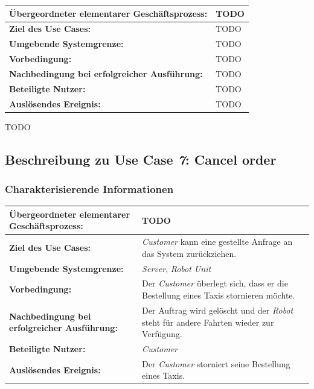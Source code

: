 			\begin{table}[H]
				\centering
				\begin{tabularx}{\textwidth}{|p{5cm}|X|}
					\hline
					\textbf{Übergeordneter elementarer Geschäftsprozess:} & TODO  \\ \hline
					\textbf{Ziel des Use Cases:} & TODO \\ \hline
					\textbf{Umgebende Systemgrenze:} & TODO \\ \hline
					\textbf{Vorbedingung:} & TODO \\ \hline
					\textbf{Nachbedingung bei erfolgreicher Ausführung:} & TODO \\ \hline
					\textbf{Beteiligte Nutzer:} & TODO \\ \hline
					\textbf{Auslösendes Ereignis:} & TODO \\
					\hline
				\end{tabularx}
			\end{table}
			
			TODO
			
			
			\pagebreak
	
		\subsection{Beschreibung zu Use Case \emph{7}: Cancel order}
			\subsubsection*{Charakterisierende Informationen}
			
			\begin{table}[H]
				\centering
				\begin{tabularx}{\textwidth}{|p{5cm}|X|}
					\hline
					\textbf{Übergeordneter elementarer Geschäftsprozess:} & TODO  \\ \hline
					\textbf{Ziel des Use Cases:} & \emph{Customer} kann eine gestellte Anfrage an das System zurückziehen. \\ \hline
					\textbf{Umgebende Systemgrenze:} & \emph{Server}, \emph{Robot Unit} \\ \hline
					\textbf{Vorbedingung:} & Der \emph{Customer} überlegt sich, dass er die Bestellung eines Taxis stornieren möchte. \\ \hline
					\textbf{Nachbedingung bei erfolgreicher Ausführung:} & Der Auftrag wird gelöscht und der \emph{Robot} steht für andere Fahrten wieder zur Verfügung. \\ \hline
					\textbf{Beteiligte Nutzer:} & \emph{Customer} \\ \hline
					\textbf{Auslösendes Ereignis:} & Der \emph{Customer} storniert seine Bestellung eines Taxis. \\
					\hline
				\end{tabularx}
			\end{table}
			
